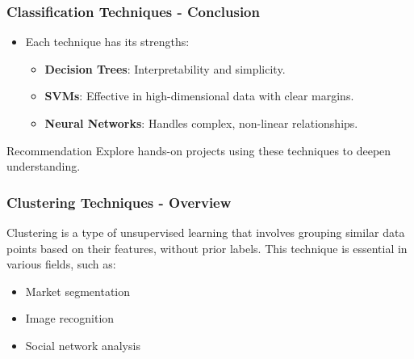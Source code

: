\documentclass[aspectratio=169]{beamer}
\begin{document}
\begin{frame}[fragile]
    \frametitle{Classification Techniques - Conclusion}
    \begin{itemize}
        \item Each technique has its strengths:
        \begin{itemize}
            \item \textbf{Decision Trees}: Interpretability and simplicity.
            \item \textbf{SVMs}: Effective in high-dimensional data with clear margins.
            \item \textbf{Neural Networks}: Handles complex, non-linear relationships.
        \end{itemize}
    \end{itemize}
    \begin{block}{Recommendation}
        Explore hands-on projects using these techniques to deepen understanding.
    \end{block}
\end{frame}

\begin{frame}[fragile]
    \frametitle{Clustering Techniques - Overview}
    Clustering is a type of unsupervised learning that involves grouping similar data points based on their features, without prior labels. This technique is essential in various fields, such as:
    \begin{itemize}
        \item Market segmentation
        \item Image recognition
        \item Social network analysis
    \end{itemize}
\end{frame}
\end{document}
